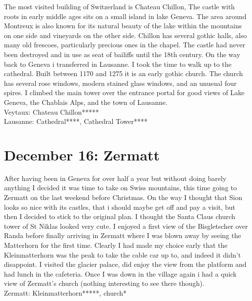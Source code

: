 The most visited building of Switzerland is Chateau Chillon, The castle with roots in early middle ages sits on a small island in lake Geneva. The area around Montreux is also known for its natural beauty of the lake within the mountains on one side and vineyards on the other side. Chillon has several gothic halls, also many old frescoes, particularly precious ones in the chapel. The castle had never been destroyed and in use as seat of bailiffs until the 18th century. On the way back to Geneva i transferred in Lausanne. I took the time to walk up to the cathedral. Built between 1170 and 1275 it is an early gothic church. The church has several rose windows, modern stained glass windows, and an unusual four spires. I climbed the main tower over the entrance portal for good views of Lake Geneva, the Chablais Alps, and the town of Lausanne.\\

Veytaux: Chateau Chillon*****\\
Lausanne: Cathedral****, Cathedral Tower****

\section{December 16: Zermatt}
\label{2007:Zermatt}

After having been in Geneva for over half a year but without doing barely anything I decided it was time to take on Swiss mountains, this time going to Zermatt on the last weekend before Christmas. On the way I thought that Sion looks so nice with its castles, that i should maybe get off and pay a visit, but then I decided to stick to the original plan. I thought the Santa Claus church tower of St Niklas looked very cute. I enjoyed a first view of the Bisgletscher over Randa before finally arriving in Zermatt where I was blown away by seeing the Matterhorn for the first time. Clearly I had made my choice early that the Kleinmatterhorn was the peak to take the cable car up to, and indeed it didn't disappoint. I visited the glacier palace, did enjoy the view from the platform and had lunch in the cafeteria. Once I was down in the village again i had a quick view of Zermatt's church (nothing interesting to see there though).\\

Zermatt: Kleinmatterhorn*****,  church*